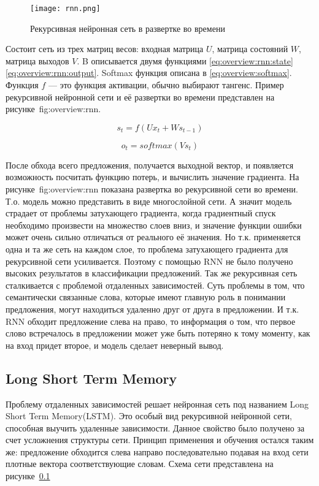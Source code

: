 \begin{figure}[h]
\centering
  \texttt{[image: rnn.png]}
  \caption{Рекурсивная нейронная сеть в развертке во времени}\label{fig:overview:rnn}
\end{figure}
Состоит сеть из трех матриц весов: входная матрица $U$, матрица состояний $W$, матрица выходов $V$. B описывается двумя функциями \ref{eq:overview:rnn:state} \ref{eq:overview:rnn:output}. Softmax функция описана в \ref{eq:overview:softmax}. Функция $f$ --- это функция активации, обычно выбирают тангенс. Пример рекурсивной нейронной сети и её развертки во времени представлен на рисунке~{fig:overview:rnn}.

\begin{equation}
  \label{eq:overview:rnn:state}
  s_t = f(Ux_t + Ws_{t-1})
\end{equation}

\begin{equation}
  \label{eq:overview:rnn:output}
  o_t = softmax(Vs_t)
\end{equation}

После обхода всего предложения, получается выходной вектор, и появляется возможность посчитать функцию потерь, и вычислить значение градиента. На рисунке~{fig:overview:rnn} показана развертка во рекурсивной сети во времени. Т.о. модель можно представить в виде многослойной сети. А значит модель страдает от проблемы затухающего градиента, когда градиентный спуск необходимо произвести на множество слоев вниз, и значение функции ошибки может очень сильно отличаться от реального её значения. Но т.к. применяется одна и та же сеть на каждом слое, то проблема затухающего градиента для рекурсивной сети усиливается. Поэтому с помощью RNN не было получено высоких результатов в классификации предложений. Так же рекурсивная сеть сталкивается с проблемой отдаленных зависимостей. Суть проблемы в том, что семантически связанные слова, которые имеют главную роль в понимании предложения, могут находиться удаленно друг от друга в предложении. И т.к. RNN обходит предложение слева на право, то информация о том, что первое слово встречалось в предложении может уже быть потеряно к тому моменту, как на вход придет второе, и модель сделает неверный вывод.

\subsection{Long Short Term Memory}\label{fig:overview:lstm}
Проблему отдаленных зависимостей решает нейронная сеть под названием Long Short Term Memory(LSTM). Это особый вид рекурсивной нейронной сети, способная выучить удаленные зависимости. Данное свойство было получено за счет усложнения структуры сети. Принцип применения и обучения остался таким же: предложение обходится слева направо последовательно подавая на вход сети плотные вектора соответствующие словам. Схема сети представлена на рисунке~\ref{fig:overview:lstm}

